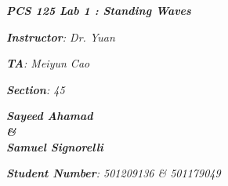 

\begin{titlepage}
    \begin{center}
        \vspace*{1cm}
            
        \date{}
            
        \huge
            
        \textit{\textbf{PCS 125 Lab 1 : Standing Waves}}
            
        \vspace{0.25cm}
            
            
            
		\vspace{0.25cm}
            
            
        \LARGE
            

		\textit{\textbf{Instructor}: Dr. Yuan}

		\textit{\textbf{TA}: Meiyun Cao}

		\textit{\textbf{Section}: 45}

		\vspace{2.5cm}

		\textit{\textbf{Sayeed Ahamad \\ \& \\ Samuel Signorelli}}
            
            
        \Large         

		\vspace{5cm}

		\vspace{0cm}            
            
		\Large		
		        
		
		\textit{\textbf{Student Number}: 501209136 \& 501179049}
            
        \vspace{2cm}
            
        \Large
         
		\vspace{0.25cm}                  
            
        \vspace{0.25cm}
           
            
    \end{center}
\end{titlepage}



